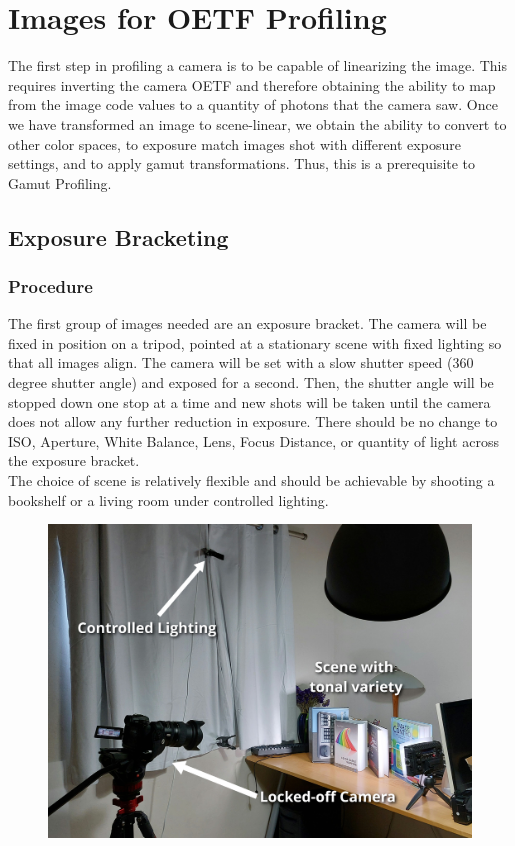 \documentclass[twoside]{article}
\begin{document}
\newpage
\newpage\section{Images for OETF Profiling}
The first step in profiling a camera is to be capable of linearizing the image. This requires inverting the camera OETF and therefore obtaining the ability to map from the image code values to a quantity of photons that the camera saw. Once we have transformed an image to scene-linear, we obtain the ability to convert to other color spaces, to exposure match images shot with different exposure settings, and to apply gamut transformations. Thus, this is a prerequisite to Gamut Profiling. \\

\subsection{Exposure Bracketing}

\subsubsection{Procedure}
The first group of images needed are an exposure bracket. The camera will be fixed in position on a tripod, pointed at a stationary scene with fixed lighting so that all images align. The camera will be set with a slow shutter speed (360 degree shutter angle) and exposed for a second. Then, the shutter angle will be stopped down one stop at a time and new shots will be taken until the camera does not allow any further reduction in exposure. There should be no change to ISO, Aperture, White Balance, Lens, Focus Distance, or quantity of light across the exposure bracket. \\

The choice of scene is relatively flexible and should be achievable by shooting a bookshelf or a living room under controlled lighting. \\

\begin{figure}[h]
    \centering
    \includegraphics[scale=0.1]{images/exposure_bracket_setup0000.jpg}
\end{figure}
\end{document}
